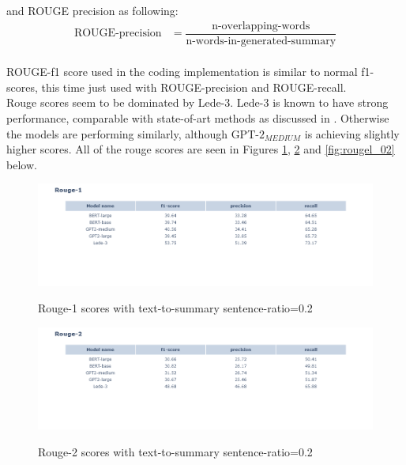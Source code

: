 \documentclass{article}
\newcommand{\gptmedium}{$\text{GPT-2}_{MEDIUM}$ }
\begin{document}
\noindent
and ROUGE precision as following:\\

\begin{align*}
	\text{ROUGE-precision} &= \dfrac{\text{n-overlapping-words}}{\text{n-words-in-generated-summary}}
\end{align*}\\

\noindent
ROUGE-f1 score used in the coding implementation is similar to normal f1-scores, this time just used with ROUGE-precision and ROUGE-recall. \cite{rouge}\\

\noindent
Rouge scores seem to be dominated by Lede-3. Lede-3 is known to have strong performance, comparable with state-of-art methods as discussed in \cite{dataset}. Otherwise the models are performing similarly, although \gptmedium is achieving slightly higher scores. All of the rouge scores are seen in Figures \ref{fig:rouge1_02}, \ref{fig:rouge2_02} and \ref{fig:rougel_02} below. 

\begin{figure}[H]
	\centering
	\includegraphics[scale=0.4]{rouge1.png}\\
	\caption{Rouge-1 scores with text-to-summary sentence-ratio=0.2}
	\label{fig:rouge1_02}
\end{figure}

\begin{figure}[H]
	\centering
	\includegraphics[scale=0.4]{rouge2.png}\\
	\caption{Rouge-2 scores with text-to-summary sentence-ratio=0.2}
	\label{fig:rouge2_02}
\end{figure}
\end{document}
